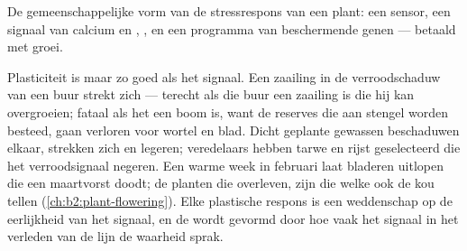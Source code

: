 \begin{omfigure}

{\small De gemeenschappelijke vorm van de stressrespons van een plant: een
sensor, een signaal van calcium en , , en
een programma van beschermende genen --- betaald met groei.}
\end{omfigure}

\begin{example}\label{ex:b2:plant-plasticity:lie}
Plasticiteit is maar zo goed als het signaal. Een zaailing in de
verroodschaduw van een buur strekt zich --- terecht als die buur een
zaailing is die hij kan overgroeien; fataal als het een boom is, want de
reserves die aan stengel worden besteed, gaan verloren voor wortel en blad.
Dicht geplante gewassen beschaduwen elkaar, strekken zich en legeren;
veredelaars hebben tarwe en rijst geselecteerd die het verroodsignaal
negeren. Een warme week in februari laat bladeren uitlopen die een
maartvorst doodt; de planten die overleven, zijn die welke ook de kou tellen
(\cref{ch:b2:plant-flowering}). Elke plastische respons is een weddenschap
op de eerlijkheid van het signaal, en de  wordt gevormd door hoe
vaak het signaal in het verleden van de lijn de waarheid sprak.
\end{example}

